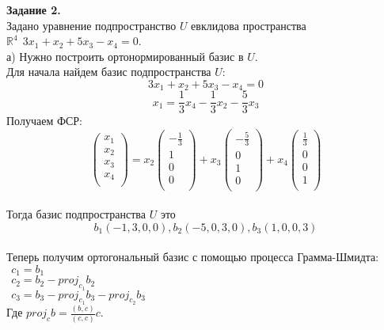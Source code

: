 \documentclass[12pt,a4paper]{scrartcl}
\begin{document}
	
	 
	\noindent
	\textbf{Задание 2.} \\	
	Задано уравнение подпространство $U$ евклидова пространства $\mathbb{R}^4~~3x_1 + x_2 + 5x_3 - x_4 = 0$.\\
	а) Нужно построить ортонормированный базис в $U$. \\
	Для начала найдем базис подпространства $U$:\\
	$$3x_1 + x_2 + 5x_3 - x_4 = 0$$
	$$x_1 = \frac{1}{3}x_4 - \frac{1}{3}x_2 - \frac{5}{3}x_3 $$
	Получаем ФСР:\\
	$$\begin{pmatrix}
	x_1\\
	x_2\\
	x_3\\
	x_4\\
	\end{pmatrix} = x_2 \begin{pmatrix}
	-\frac{1}{3}\\
	1\\
	0\\
	0\\
	\end{pmatrix} + x_3\begin{pmatrix}
	-\frac{5}{3}\\
	0\\
	1\\
	0\\
	\end{pmatrix} + x_4\begin{pmatrix}
	\frac{1}{3}\\
	0\\
	0\\
	1\\
	\end{pmatrix}$$
	\\
	Тогда базис подпространства $U$ это \\
	$$b_1(-1, 3, 0, 0), b_2(-5, 0, 3, 0), b_3(1, 0, 0, 3)$$ \\
	Теперь получим ортогональный базис с помощью процесса Грамма-Шмидта:\\
	$~~c_1 = b_1$\\
	$~~c_2 = b_2 - proj_{c_1}b_2$\\
	$~~c_3 = b_3 - proj_{c_1}b_3 - proj_{c_2}b_3$\\
	
	Где $proj_{c}b = \frac{(b, c)}{(c, c)}c$.\\
	
\end{document}
